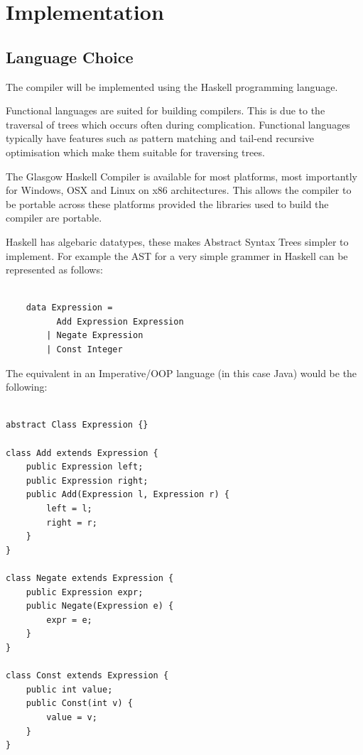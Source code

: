 \chapter{Implementation}


\section{Language Choice}

The compiler will be implemented using the Haskell programming language.

Functional languages are suited for building compilers.
This is due to the traversal of trees which occurs often during complication.
Functional languages typically have features such as pattern matching and tail-end recursive optimisation 
which make them suitable for traversing trees.

The Glasgow Haskell Compiler is available for most platforms, most importantly for Windows, OSX and Linux 
on x86 architectures. This allows the compiler to be portable across these platforms provided the libraries 
used to build the compiler are portable.

Haskell has algebaric datatypes, these makes Abstract Syntax Trees
simpler to implement. For example the AST for a very simple grammer
in Haskell can be represented as follows:

\begin{lstlisting}[style=myHaskell]

    data Expression =
          Add Expression Expression
        | Negate Expression 
        | Const Integer

\end{lstlisting}

The equivalent in an Imperative/OOP language (in this case Java)
would be the following:

\begin{lstlisting}[style=myJava]

abstract Class Expression {}

class Add extends Expression {
    public Expression left;
    public Expression right;
    public Add(Expression l, Expression r) {
        left = l;
        right = r;    
    } 
}

class Negate extends Expression {
    public Expression expr;
    public Negate(Expression e) {
        expr = e;    
    }
} 

class Const extends Expression {
    public int value;
    public Const(int v) {
        value = v;
    }
}       

\end{lstlisting}

